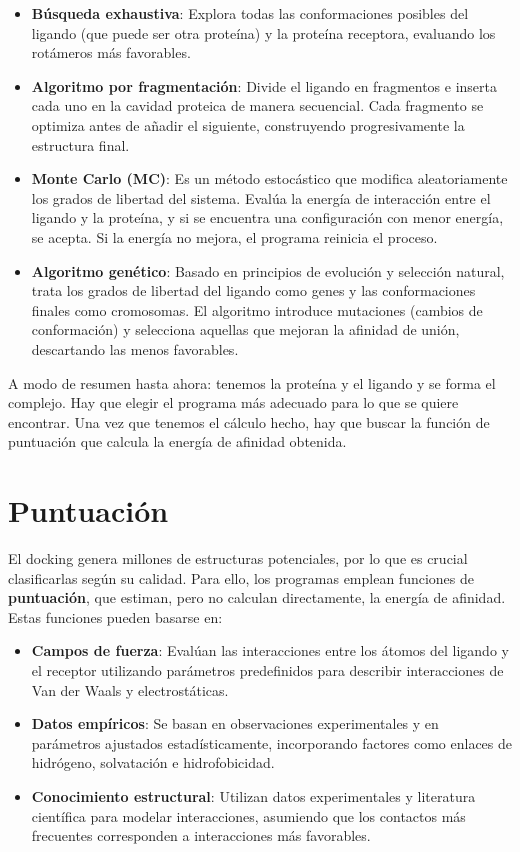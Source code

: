 \begin{itemize}
\item \textbf{Búsqueda exhaustiva}: Explora todas las conformaciones posibles del ligando (que puede ser otra proteína) y la proteína receptora, evaluando los rotámeros más favorables.

\item \textbf{Algoritmo por fragmentación}: Divide el ligando en fragmentos e inserta cada uno en la cavidad proteica de manera secuencial. Cada fragmento se optimiza antes de añadir el siguiente, construyendo progresivamente la estructura final.

\item \textbf{Monte Carlo (MC)}: Es un método estocástico que modifica aleatoriamente los grados de libertad del sistema. Evalúa la energía de interacción entre el ligando y la proteína, y si se encuentra una configuración con menor energía, se acepta. Si la energía no mejora, el programa reinicia el proceso.

\item \textbf{Algoritmo genético}: Basado en principios de evolución y selección natural, trata los grados de libertad del ligando como genes y las conformaciones finales como cromosomas. El algoritmo introduce mutaciones (cambios de conformación) y selecciona aquellas que mejoran la afinidad de unión, descartando las menos favorables.
\end{itemize}

A modo de resumen hasta ahora: tenemos la proteína y el ligando y se forma el complejo. Hay que elegir el programa más adecuado para lo que se quiere encontrar. Una vez que tenemos el cálculo hecho, hay que buscar la función de puntuación que calcula la energía de afinidad obtenida.

\section{Puntuación}
El docking genera millones de estructuras potenciales, por lo que es crucial clasificarlas según su calidad. Para ello, los programas emplean funciones de \textbf{puntuación}, que estiman, pero no calculan directamente, la energía de afinidad. Estas funciones pueden basarse en:
\begin{itemize}
\item \textbf{Campos de fuerza}: Evalúan las interacciones entre los átomos del ligando y el receptor utilizando parámetros predefinidos para describir interacciones de Van der Waals y electrostáticas.

\item \textbf{Datos empíricos}: Se basan en observaciones experimentales y en parámetros ajustados estadísticamente, incorporando factores como enlaces de hidrógeno, solvatación e hidrofobicidad.

\item \textbf{Conocimiento estructural}: Utilizan datos experimentales y literatura científica para modelar interacciones, asumiendo que los contactos más frecuentes corresponden a interacciones más favorables.
\end{itemize}


